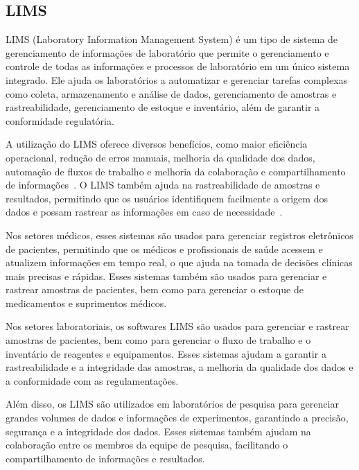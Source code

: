\subsection{LIMS}


LIMS (Laboratory Information Management System) é um tipo de sistema de gerenciamento de informações de laboratório que permite o gerenciamento e controle de todas as informações e processos de laboratório em um único sistema integrado. Ele ajuda os laboratórios a automatizar e gerenciar tarefas complexas como coleta, armazenamento e análise de dados, gerenciamento de amostras e rastreabilidade, gerenciamento de estoque e inventário, além de garantir a conformidade regulatória.


A utilização do LIMS oferece diversos benefícios, como maior eficiência operacional, redução de erros manuais, melhoria da qualidade dos dados, automação de fluxos de trabalho e melhoria da colaboração e compartilhamento de informações~\cite{Key2011LIMS:Systems}. O LIMS também ajuda na rastreabilidade de amostras e resultados, permitindo que os usuários identifiquem facilmente a origem dos dados e possam rastrear as informações em caso de necessidade~\cite{Cagnd2004ImportanceFactories}.


Nos setores médicos, esses sistemas são usados para gerenciar registros eletrônicos de pacientes, permitindo que os médicos e profissionais de saúde acessem e atualizem informações em tempo real, o que ajuda na tomada de decisões clínicas mais precisas e rápidas. Esses sistemas também são usados para gerenciar e rastrear amostras de pacientes, bem como para gerenciar o estoque de medicamentos e suprimentos médicos.

Nos setores laboratoriais, os softwares LIMS são usados para gerenciar e rastrear amostras de pacientes, bem como para gerenciar o fluxo de trabalho e o inventário de reagentes e equipamentos. Esses sistemas ajudam a garantir a rastreabilidade e a integridade das amostras, a melhoria da qualidade dos dados e a conformidade com as regulamentações.

Além disso, os LIMS são utilizados em laboratórios de pesquisa para gerenciar grandes volumes de dados e informações de experimentos, garantindo a precisão, segurança e a integridade dos dados. Esses sistemas também ajudam na colaboração entre os membros da equipe de pesquisa, facilitando o compartilhamento de informações e resultados.


